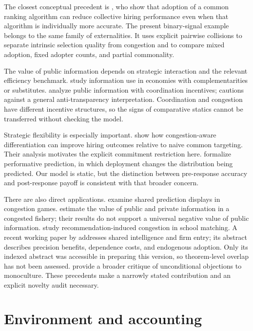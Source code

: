\documentclass[11pt,a4paper]{article}
\theoremstyle{definition}
\theoremstyle{remark}
\begin{document}
The closest conceptual precedent is \citet{kleinberg2021}, who show that adoption of a common ranking algorithm can reduce collective hiring performance even when that algorithm is individually more accurate. The present binary-signal example belongs to the same family of externalities. It uses explicit pairwise collisions to separate intrinsic selection quality from congestion and to compare mixed adoption, fixed adopter counts, and partial commonality.

The value of public information depends on strategic interaction and the relevant efficiency benchmark. \citet{angeletos2007} study information use in economies with complementarities or substitutes. \citet{morris2002} analyze public information with coordination incentives; \citet{svensson2006} cautions against a general anti-transparency interpretation. Coordination and congestion have different incentive structures, so the signs of comparative statics cannot be transferred without checking the model.

Strategic flexibility is especially important. \citet{baek2026} show how congestion-aware differentiation can improve hiring outcomes relative to naive common targeting. Their analysis motivates the explicit commitment restriction here. \citet{perdomo2020} formalize performative prediction, in which deployment changes the distribution being predicted. Our model is static, but the distinction between pre-response accuracy and post-response payoff is consistent with that broader concern.

There are also direct applications. \citet{zhang2024} examine shared prediction displays in congestion games. \citet{englander2025} estimate the value of public and private information in a congested fishery; their results do not support a universal negative value of public information. \citet{chiang2026} study recommendation-induced congestion in school matching. A recent working paper by \citet{chi2026} addresses shared intelligence and firm entry; its abstract describes precision benefits, dependence costs, and endogenous adoption. Only its indexed abstract was accessible in preparing this version, so theorem-level overlap has not been assessed. \citet{hedden2026} provide a broader critique of unconditional objections to monoculture. These precedents make a narrowly stated contribution and an explicit novelty audit necessary.

\section{Environment and accounting}
\end{document}
